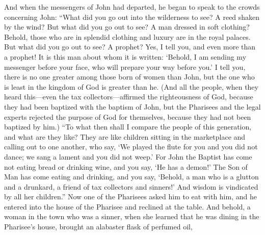 \begin{biblechapter}
\verse And when the messengers of John had departed, he began to speak to the crowds concerning John: “What did you go out into the wilderness to see? A reed shaken by the wind?
\verse But what did you go out to see? A man dressed in soft clothing? Behold, those who are in splendid clothing and luxury are in the royal palaces.
\verse But what did you go out to see? A prophet? Yes, I tell you, and even more than a prophet!
\verse It is this man about whom it is written: ‘Behold, I am sending my messenger before your face, 
who will prepare your way before you.’
\verse I tell you, there is no one greater among those born of women than John, but the one who is least in the kingdom of God is greater than he.
\verse (And all the people, when they heard this—even the tax collectors—affirmed the righteousness of God, because they had been baptized with the baptism of John,
\verse but the Pharisees and the legal experts rejected the purpose of God for themselves, because they had not been baptized by him.)
\verse “To what then shall I compare the people of this generation, and what are they like?
\verse They are like children sitting in the marketplace and calling out to one another, who say, ‘We played the flute for you and you did not dance; 
we sang a lament and you did not weep.’
\verse For John the Baptist has come not eating bread or drinking wine, and you say, ‘He has a demon!’
\verse The Son of Man has come eating and drinking, and you say, ‘Behold, a man who is a glutton and a drunkard, a friend of tax collectors and sinners!’
\verse And wisdom is vindicated by all her children.”
 Now one of the Pharisees asked him to eat with him, and he entered into the house of the Pharisee and reclined at the table.
\verse And behold, a woman in the town who was a sinner, when she learned that he was dining in the Pharisee’s house, brought an alabaster flask of perfumed oil,

\end{biblechapter}
